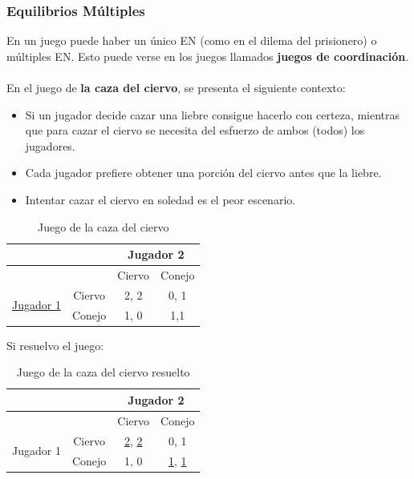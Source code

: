 \documentclass{article}
\newcommand{\ulcolor}[2][Red]{\setulcolor{#1}\ul{#2}}
\begin{document}
            \subsubsection*{Equilibrios Múltiples}
                En un juego puede haber un único EN (como en el dilema del prisionero) o múltiples EN. Esto puede verse en los juegos llamados \textbf{juegos de coordinación}. \\
                \\
                En el juego de \textbf{la caza del ciervo}, se presenta el siguiente contexto:
                \begin{itemize}
                    \item Si un jugador decide cazar una liebre consigue hacerlo con certeza, mientras que para cazar el ciervo se necesita del esfuerzo de ambos (todos) los jugadores.
                    \item Cada jugador prefiere obtener una porción del ciervo antes que la liebre.
                    \item Intentar cazar el ciervo en soledad es el peor escenario.
                \end{itemize}
                \begin{table}[H]
                    \centering
                        \begin{tabular}{|c|c|c|c|}
                        \hline
                        & & \multicolumn{2}{c|}{Jugador 2} \\ \hline
                                                & & Ciervo & Conejo \\ \hline
                        \multirow{2}{*}{\ulcolor[Red]{Jugador 1}} 
                                                & Ciervo & 2, 2 & 0, 1 \\ \cline{2-4} 
                                                & Conejo & 1, 0 & 1,1 \\ \hline
                        \end{tabular}
                    \caption{Juego de la caza del ciervo}
                \end{table}
                Si resuelvo el juego:
                \begin{table}[H]
                    \centering
                        \begin{tabular}{|c|c|c|c|}
                        \hline
                        & & \multicolumn{2}{c|}{Jugador 2} \\ \hline
                                                & & Ciervo & Conejo \\ \hline
                        \multirow{2}{*}{Jugador 1} 
                                                & Ciervo & \ulcolor[Red]{2}, \ulcolor[Blue]{2} & 0, 1 \\ \cline{2-4} 
                                                & Conejo & 1, 0 & \ulcolor[Red]{1}, \ulcolor[Blue]{1} \\ \hline
                        \end{tabular}
                    \caption{Juego de la caza del ciervo resuelto}
                \end{table}
\end{document}
